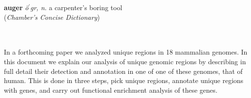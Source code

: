 \hspace{6.5cm}\begin{minipage}{10cm}\textbf{auger} \emph{\"o$^\prime$g\schwa r, n.} a carpenter's
boring tool\\(\emph{Chamber's Concise Dictionary})
\end{minipage}\\\\
In a forthcoming paper we analyzed unique regions in 18 mammalian
genomes. In this document we explain our analysis of unique genomic
regions by describing in full detail their detection and annotation in
one of one of these genomes, that of human. This is done in three
steps, pick unique regions, annotate unique regions with genes, and
carry out functional enrichment analysis of these genes.
